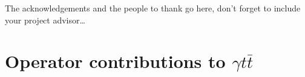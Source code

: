\documentclass[oneside, a4paper, 11pt, ]{report}
\begin{document}
\clearpage



The acknowledgements and the people to thank go here, don't forget to include your project advisor\ldots
\clearpage %


\setcounter{page}{1}

\pagestyle{fancy}
\fancyhead[L,RO]{\slshape \nouppercase } %
\fancyhead[RE,LO]{\slshape \nouppercase \leftmark}

\tableofcontents
\listoffigures
\listoftables
\clearpage


\setcounter{page}{1}

\clearpage
























\appendix
\appendixpage
\addappheadtotoc

\renewcommand{\thesection}{A.\arabic{section}}
\renewcommand\thefigure{\thesection}
\renewcommand\thetable{\thesection}

\section{Operator contributions to $\gamma t \bar{t}$}
\end{document}
